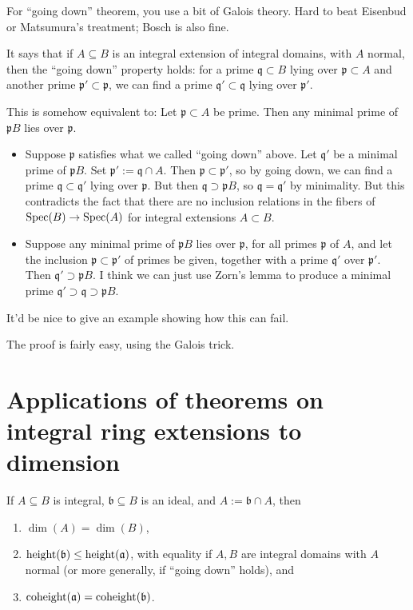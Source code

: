 \documentclass[10pt]{article}
\begin{document}
For ``going down'' theorem, you use a bit of Galois theory.
Hard to beat Eisenbud or Matsumura's treatment; Bosch is also fine.

It says that if \(A \subseteq B\) is an integral extension of
integral domains, with \(A\) normal, then the ``going down''
property holds: for a prime \(\mathfrak{q} \subset B\) lying over
\(\mathfrak{p} \subset A\) and another prime
\(\mathfrak{p} ' \subset \mathfrak{p}\), we can find a prime
\(\mathfrak{q} ' \subset \mathfrak{q}\) lying over
\(\mathfrak{p}'\).

This is somehow equivalent to: Let \(\mathfrak{p} \subset A\) be
prime.  Then any minimal prime of \(\mathfrak{p} B\) lies over
\(\mathfrak{p}\).
\begin{itemize}
\item Suppose $\mathfrak{p}$ satisfies what we called ``going
  down'' above.  Let $\mathfrak{q}'$ be a minimal prime of
  $\mathfrak{p} B$.  Set
  $\mathfrak{p} ' := \mathfrak{q} \cap A$.  Then
  $\mathfrak{p} \subset \mathfrak{p}'$, so by going down, we can
  find a prime $\mathfrak{q} \subset \mathfrak{q} '$ lying over
  $\mathfrak{p}$.  But then
  $\mathfrak{q} \supset \mathfrak{p} B$, so
  $\mathfrak{q} = \mathfrak{q} '$ by minimality.  But this
  contradicts the fact that there are no inclusion relations in
  the fibers of $\operatorname{Spec}(B) \rightarrow \operatorname{Spec}(A)$ for integral
  extensions $A \subset B$.
\item Suppose any minimal prime of $\mathfrak{p} B$ lies over
  $\mathfrak{p}$, for all primes $\mathfrak{p}$ of $A$, and let
  the inclusion $\mathfrak{p} \subset \mathfrak{p}'$ of primes
  be given, together with a prime $\mathfrak{q}'$ over
  $\mathfrak{p}'$.  Then $\mathfrak{q}' \supset \mathfrak{p} B$.
  I think we can just use Zorn's lemma to produce a minimal
  prime
  $\mathfrak{q} ' \supset \mathfrak{q} \supset \mathfrak{p} B$.
\end{itemize}

It'd be nice to give an example showing how this can fail.

The proof is fairly easy, using the Galois trick.


\section{Applications of theorems on integral ring extensions to dimension}
\label{sec:org04b0a0a}

If \(A \subseteq B\) is integral,
\(\mathfrak{b} \subseteq B\) is an ideal,
and \(A := \mathfrak{b} \cap A\),
then
\begin{enumerate}
\item $\dim(A) = \dim(B)$,
\item $\operatorname{height}(\mathfrak{b}) \leq \operatorname{height}(\mathfrak{a})$,
  with equality if $A,B$ are integral domains
  with $A$ normal (or more generally, if ``going down'' holds), and
\item $\operatorname{coheight}(\mathfrak{a}) = \operatorname{coheight}(\mathfrak{b})$.
\end{enumerate}
\end{document}
